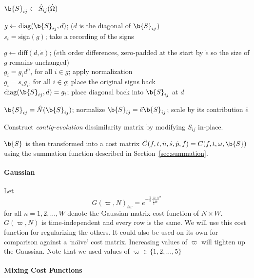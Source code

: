 \documentclass[twocolumn]{article}
\begin{document}
\begin{algorithm}
	\DontPrintSemicolon %

	$\b{S}_{ij} \gets \hat S_{ij}( \dot \Omega )$
	
	 {
	
	$g \gets \mathrm{diag}( \b{S}_{ij}, d )$; ($d$ is the diagonal of $\b{S}_{ij}$)\\
	$s_i = \mathrm{sign}(g)$; take a recording of the signs 
	
		$g \gets \mathrm{diff}( d, \dot e )$; ($\dot e$th order differences, zero-padded at the start by $\dot e$ so the size of $g$ remains unchanged) \\
		$g_i = g_id^{\dot n}$, for all $i \in g$; apply normalization \\
		$g_i = s_ig_i$, for all $i \in g$; place the original signs back \\
		$\mathrm{diag}( \b{S}_{ij}, d ) = g_i$; place diagonal back into $\b{S}_{ij}$ at $d$
	}
	
	$\b{S}_{ij} = \hat N(\b{S}_{ij})$; normalize 
	$\b{S}_{ij} =\bar e \b{S}_{ij}$; scale by its contribution $\bar e$
	
	\;
	\caption{Construct \textit{contig-evolution} dissimilarity matrix by modifying $S_{ij}$ in-place.}
	\label{algo:contig}
\end{algorithm}

$\b{S}$ is then transformed into a cost matrix $\vec{C}(f,t,\bar n,\dot s,\dot p,\dot f) = C(f,t, \omega, \b{S})$ using the summation function described in Section~\ref{sec:summation}.

	\paragraph{Gaussian}
	Let \[
	G( \varpi, N )_{tw} = e^{ - \frac{1}{2} \frac{\varpi n}{ \frac{1}{2} W}^2  }
	\] for all $n=1,2,\ldots,W$ denote the Gaussian matrix cost function of $N\times W$. $G( \varpi, N )$ is time-independent and every row is the same. We will use this cost function for regularizing the others. It could also be used on its own for comparison against a `na\"{\i}ve' cost matrix. Increasing values of $\varpi$ will tighten up the Gaussian. Note that we used values of $\varpi \in \{1,2,\ldots,5\}$
	
	\paragraph{Mixing Cost Functions}
	
\end{document}
